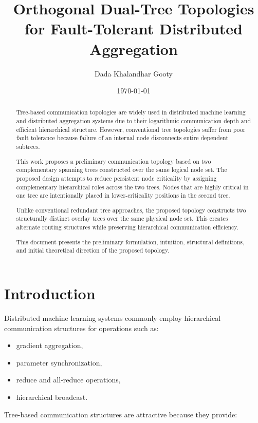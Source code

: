 \documentclass[11pt]{article}
\title{
Orthogonal Dual-Tree Topologies for Fault-Tolerant Distributed Aggregation
}
\author{
Dada Khalandhar Gooty
}
\date{\today}
\begin{document}
\maketitle

\begin{abstract}

Tree-based communication topologies are widely used in distributed machine learning and distributed aggregation systems due to their logarithmic communication depth and efficient hierarchical structure. However, conventional tree topologies suffer from poor fault tolerance because failure of an internal node disconnects entire dependent subtrees.

This work proposes a preliminary communication topology based on two complementary spanning trees constructed over the same logical node set. The proposed design attempts to reduce persistent node criticality by assigning complementary hierarchical roles across the two trees. Nodes that are highly critical in one tree are intentionally placed in lower-criticality positions in the second tree.

Unlike conventional redundant tree approaches, the proposed topology constructs two structurally distinct overlay trees over the same physical node set. This creates alternate routing structures while preserving hierarchical communication efficiency.

This document presents the preliminary formulation, intuition, structural definitions, and initial theoretical direction of the proposed topology.

\end{abstract}

\section{Introduction}

Distributed machine learning systems commonly employ hierarchical communication structures for operations such as:

\begin{itemize}
    \item gradient aggregation,
    \item parameter synchronization,
    \item reduce and all-reduce operations,
    \item hierarchical broadcast.
\end{itemize}

Tree-based communication structures are attractive because they provide:
\end{document}

